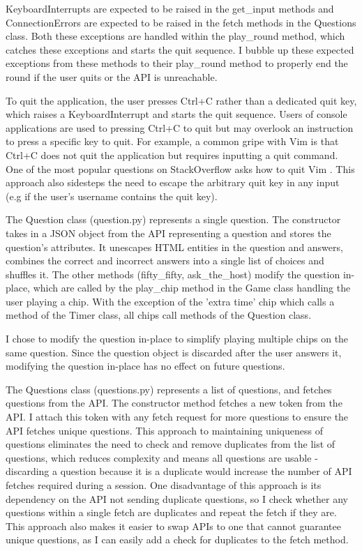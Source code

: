 \documentclass[12pt]{article}
\begin{document}
KeyboardInterrupts are expected to be raised in the get\_input methods and ConnectionErrors are expected to be raised in the fetch methods in the Questions class. Both these exceptions are handled within the play\_round method, which catches these exceptions and starts the quit sequence. I bubble up these expected exceptions from these methods to their play\_round method to properly end the round if the user quits or the API is unreachable. 

To quit the application, the user presses Ctrl+C rather than a dedicated quit key, which raises a KeyboardInterrupt and starts the quit sequence. Users of console applications are used to pressing Ctrl+C to quit but may overlook an instruction to press a specific key to quit. For example, a common gripe with Vim is that Ctrl+C does not quit the application but requires inputting a quit command. One of the most popular questions on StackOverflow asks how to quit Vim \cite{web:1}. This approach also sidesteps the need to escape the arbitrary quit key in any input (e.g if the user's username contains the quit key). 

\vspace{\baselineskip}

The Question class (question.py) represents a single question. The constructor takes in a JSON object from the API representing a question and stores the question's attributes. It unescapes HTML entities in the question and answers, combines the correct and incorrect answers into a single list of choices and shuffles it. The other methods (fifty\_fifty, ask\_the\_host) modify the question in-place, which are called by the play\_chip method in the Game class handling the user playing a chip. With the exception of the 'extra time' chip which calls a method of the Timer class, all chips call methods of the Question class.

I chose to modify the question in-place to simplify playing multiple chips on the same question. Since the question object is discarded after the user answers it, modifying the question in-place has no effect on future questions.

\vspace{\baselineskip}

The Questions class (questions.py) represents a list of questions, and fetches questions from the API. The constructor method fetches a new token from the API. I attach this token with any fetch request for more questions to ensure the API fetches unique questions. This approach to maintaining uniqueness of questions eliminates the need to check and remove duplicates from the list of questions, which reduces complexity and means all questions are usable - discarding a question because it is a duplicate would increase the number of API fetches required during a session. One disadvantage of this approach is its dependency on the API not sending duplicate questions, so I check whether any questions within a single fetch are duplicates and repeat the fetch if they are. This approach also makes it easier to swap APIs to one that cannot guarantee unique questions, as I can easily add a check for duplicates to the fetch method. 
\end{document}
